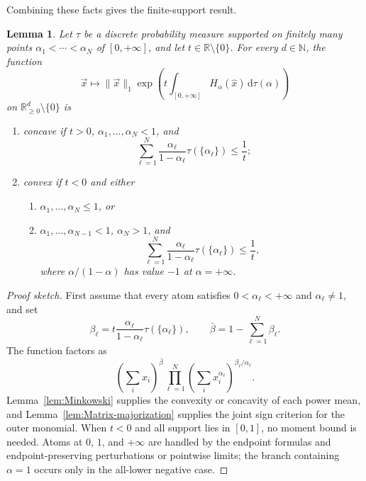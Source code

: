 \documentclass[aps,pra,11pt,onecolumn,nofootinbib,tightenlines]{revtex4-2}
\newtheorem{lemma}[theorem]{Lemma}
\theoremstyle{definition}
\def \d {\mathrm{d}}
\newcommand{\R}{\mathbb{R}}
\newcommand{\mb}[1]{\mathbb{#1}}
\begin{document}
Combining these facts gives the finite-support result.

\begin{lemma}
\label{lem:discrete-measure}
Let $\tau$ be a discrete probability measure supported on finitely many points
$\alpha_1<\cdots<\alpha_N$ of $[0,+\infty]$, and let
$t\in\R\setminus\{0\}$.  For every $d\in\mb{N}$, the function
\begin{equation}
\vec{x}\longmapsto\|\vec{x}\|_1
\exp\!\left(t\int_{[0,+\infty]}H_\alpha(\hat{x})\,
\d\tau(\alpha)\right)
\end{equation}
on $\R^d_{\geq0}\setminus\{0\}$ is
\begin{enumerate}
\item concave if $t>0$, $\alpha_1,\ldots,\alpha_N<1$, and
\begin{equation}
\sum_{\ell=1}^N\frac{\alpha_\ell}{1-\alpha_\ell}
\tau(\{\alpha_\ell\})\leq\frac1t;
\end{equation}
\item convex if $t<0$ and either
  \begin{enumerate}[label=(\alph*)]
  \item $\alpha_1,\ldots,\alpha_N\leq1$, or
  \item $\alpha_1,\ldots,\alpha_{N-1}<1$, $\alpha_N>1$, and
  \begin{equation}
  \sum_{\ell=1}^N\frac{\alpha_\ell}{1-\alpha_\ell}
  \tau(\{\alpha_\ell\})\leq\frac1t,
  \end{equation}
  where $\alpha/(1-\alpha)$ has value $-1$ at $\alpha=+\infty$.
  \end{enumerate}
\end{enumerate}
\end{lemma}

\begin{proof}[Proof sketch]
First assume that every atom satisfies
$0<\alpha_\ell<+\infty$ and $\alpha_\ell\neq1$, and set
\begin{equation}
\beta_\ell=t\frac{\alpha_\ell}{1-\alpha_\ell}
\tau(\{\alpha_\ell\}),
\qquad
\bar\beta=1-\sum_{\ell=1}^N\beta_\ell.
\end{equation}
The function factors as
\begin{equation}
\left(\sum_i x_i\right)^{\bar\beta}
\prod_{\ell=1}^N
\left(\sum_i x_i^{\alpha_\ell}\right)^{\beta_\ell/\alpha_\ell}.
\end{equation}
Lemma~\ref{lem:Minkowski} supplies the convexity or concavity of each power mean,
and Lemma~\ref{lem:Matrix-majorization} supplies the joint sign criterion for the
outer monomial.  When $t<0$ and all support lies in $[0,1]$, no moment bound is
needed.  Atoms at $0$, $1$, and $+\infty$ are handled by the endpoint formulas
and endpoint-preserving perturbations or pointwise limits; the branch containing
$\alpha=1$ occurs only in the all-lower negative case.
\end{proof}
\end{document}
